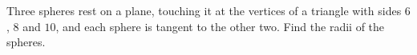 Three spheres rest on a plane, touching it at the vertices of a triangle with sides $6$, $8$ and $10$, and each sphere is tangent to the other two. Find the radii of the spheres.

